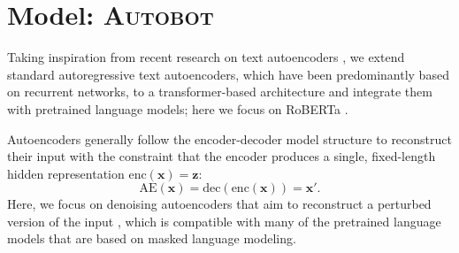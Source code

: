 
\section{Model: \textsc{Autobot}}\label{sec:model}
Taking inspiration from recent research on text autoencoders \citep{bowman2015generating,shen2019educating,mai2020plug}, we extend standard autoregressive text autoencoders, which have been predominantly based on recurrent networks, to a transformer-based architecture and integrate them with pretrained language models; here we focus on RoBERTa \cite{liu2019RoBERTa}.

Autoencoders generally follow the encoder-decoder model structure to reconstruct their input with the constraint that the encoder produces a single, fixed-length hidden representation $\text{enc}(\boldsymbol{x}) = \mathbf{z}$:
\begin{equation}
\text{AE}(\boldsymbol{x}) = \text{dec}(\text{enc}(\boldsymbol{x})) = \boldsymbol{x}'.
\end{equation}
\noindent Here, we focus on denoising autoencoders that aim to reconstruct a perturbed version of the input  \citep{vincent2010stacked,shen2019educating}, which is compatible with many of the pretrained language models that are based on masked language modeling. 
